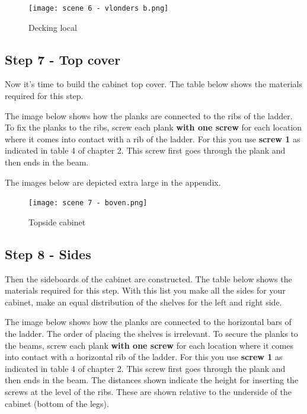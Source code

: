 \documentclass{article}
\begin{document}
\begin{figure}[h!]
    \centering
    \texttt{[image: scene 6 - vlonders b.png]}
    \caption{Decking local}
    \label{fig:stap 6b}
\end{figure}

\clearpage
\newpage

\subsection{Step 7 - Top cover}

Now it's time to build the cabinet top cover. The table below shows the materials required for this step.



The image below shows how the planks are connected to the ribs of the ladder. To fix the planks to the ribs, screw each plank \textbf{with one screw} for each location where it comes into contact with a rib of the ladder. For this you use \textbf{screw 1} as indicated in table 4 of chapter 2. This screw first goes through the plank and then ends in the beam.

The images below are depicted extra large in the appendix.

\begin{figure}[h!]
    \centering
    \texttt{[image: scene 7 - boven.png]}
    \caption{Topside cabinet}
    \label{fig:stap 7}
\end{figure}

\clearpage
\newpage

\subsection{Step 8 - Sides}

Then the sideboards of the cabinet are constructed. The table below shows the materials required for this step. With this list you make all the sides for your cabinet, make an equal distribution of the shelves for the left and right side.



The image below shows how the planks are connected to the horizontal bars of the ladder. The order of placing the shelves is irrelevant. To secure the planks to the beams, screw each plank \textbf{with one screw} for each location where it comes into contact with a horizontal rib of the ladder. For this you use \textbf{screw 1} as indicated in table 4 of chapter 2. This screw first goes through the plank and then ends in the beam. The distances shown indicate the height for inserting the screws at the level of the ribs. These are shown relative to the underside of the cabinet (bottom of the legs).
\end{document}
